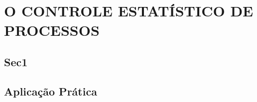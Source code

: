 \chapter{O CONTROLE ESTATÍSTICO DE PROCESSOS}
\label{chap:controle_estatistico_de_processos}


\section{Sec1}
\label{sec:controle_estatistico_sec1}




\section{Aplicação Prática}
\label{sec:controle_estatistico_aplicacao}
